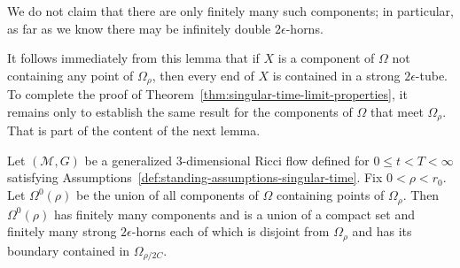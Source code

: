 \begin{remark}
\label{rem:possibly-infinitely-many-horns}
We do not claim that there are only finitely many such components;
in particular, as far as we know there may be infinitely double
$2\epsilon$-horns.
\end{remark}

It follows immediately from this lemma that if $X$ is a component of $\Omega$
not containing any point of $\Omega_\rho$, then every end of $X$ is contained
in a strong $2\epsilon$-tube. To complete the proof of Theorem~\ref{thm:singular-time-limit-properties}, it
remains only to establish the same result for the components of $\Omega$ that
meet $\Omega_\rho$. That is part of the content of the next lemma.


\begin{lemma}
\label{lem:finitely-many-horns-meeting-omega-rho}
\label{2epshorns}
Let $({\mathcal M},G)$ be a generalized $3$-dimensional Ricci flow
defined for $0\le t<T<\infty$ satisfying
Assumptions~\ref{def:standing-assumptions-singular-time}. Fix $0<\rho<r_0$.  Let
$\Omega^0(\rho)$ be the union of all components of $\Omega$
containing points of $\Omega_\rho$. Then $\Omega^0(\rho)$ has
finitely many components and is a union of a compact set and
finitely many strong $2\epsilon$-horns each of which is disjoint
from $\Omega_\rho$ and has its boundary contained in
$\Omega_{\rho/2C}$.
\end{lemma}


